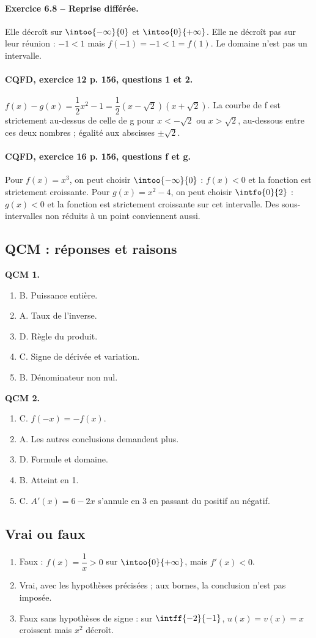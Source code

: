 \paragraph{Exercice 6.8 -- Reprise différée.} Elle décroît sur $\intoo{-\infty}{0}$ et $\intoo{0}{+\infty}$. Elle ne décroît pas sur leur réunion : $-1<1$ mais $f(-1)=-1<1=f(1)$. Le domaine n’est pas un intervalle.
\paragraph{CQFD, exercice 12 p. 156, questions 1 et 2.} $f(x)-g(x)=\dfrac12x^2-1=\dfrac12(x-\sqrt2)(x+\sqrt2)$. La courbe de f est strictement au-dessus de celle de g pour $x<-\sqrt2$ ou $x>\sqrt2$, au-dessous entre ces deux nombres ; égalité aux abscisses $\pm\sqrt2$.
\paragraph{CQFD, exercice 16 p. 156, questions f et g.} Pour $f(x)=x^3$, on peut choisir $\intoo{-\infty}{0}$ : $f(x)<0$ et la fonction est strictement croissante. Pour $g(x)=x^2-4$, on peut choisir $\intfo{0}{2}$ : $g(x)<0$ et la fonction est strictement croissante sur cet intervalle. Des sous-intervalles non réduits à un point conviennent aussi.
\subsection*{QCM : réponses et raisons}
\textbf{QCM 1.}
\begin{enumerate}
\item B. Puissance entière.
\item A. Taux de l’inverse.
\item D. Règle du produit.
\item C. Signe de dérivée et variation.
\item B. Dénominateur non nul.
\end{enumerate}
\textbf{QCM 2.}
\begin{enumerate}
\item C. $f(-x)=-f(x)$.
\item A. Les autres conclusions demandent plus.
\item D. Formule et domaine.
\item B. Atteint en 1.
\item C. $A\prime(x)=6-2x$ s’annule en 3 en passant du positif au négatif.
\end{enumerate}
\subsection*{Vrai ou faux}
\begin{enumerate}
\item Faux : $f(x)=\dfrac{1}{x}>0$ sur $\intoo{0}{+\infty}$, mais $f\prime(x)<0$.
\item Vrai, avec les hypothèses précisées ; aux bornes, la conclusion n’est pas imposée.
\item Faux sans hypothèses de signe : sur $\intff{-2}{-1}$, $u(x)=v(x)=x$ croissent mais $x^2$ décroît.
\end{enumerate}
